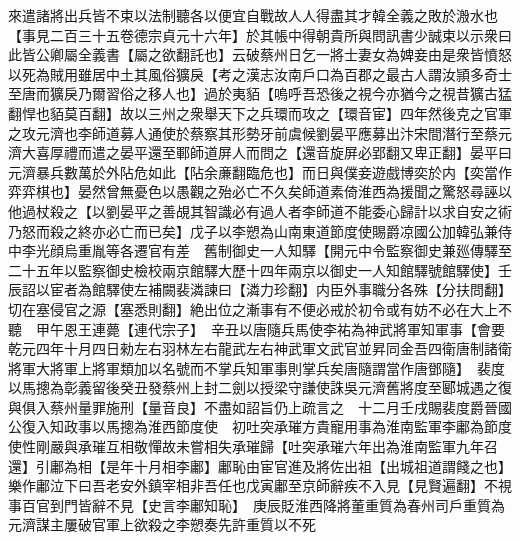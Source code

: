 來遣諸將出兵皆不束以法制聽各以便宜自戰故人人得盡其才韓全義之敗於溵水也【事見二百三十五卷德宗貞元十六年】於其帳中得朝貴所與問訊書少誠束以示衆曰此皆公卿屬全義書【屬之欲翻託也】云破蔡州日乞一將士妻女為婢妾由是衆皆憤怒以死為賊用雖居中土其風俗獷戾【考之漢志汝南戶口為百郡之最古人謂汝頴多奇士至唐而獷戾乃爾習俗之移人也】過於夷貊【嗚呼吾恐後之視今亦猶今之視昔獷古猛翻悍也貊莫百翻】故以三州之衆舉天下之兵環而攻之【環音宦】四年然後克之官軍之攻元濟也李師道募人通使於蔡察其形勢牙前虞候劉晏平應募出汴宋間潛行至蔡元濟大喜厚禮而遣之晏平還至鄆師道屏人而問之【還音旋屏必郢翻又卑正翻】晏平曰元濟暴兵數萬於外阽危如此【阽余亷翻臨危也】而日與僕妾遊戲博奕於内【奕當作弈弈棋也】晏然曾無憂色以愚觀之殆必亡不久矣師道素倚淮西為援聞之驚怒尋誣以他過杖殺之【以劉晏平之善覘其智識必有過人者李師道不能委心歸計以求自安之術乃怒而殺之終亦必亡而已矣】戊子以李愬為山南東道節度使賜爵凉國公加韓弘兼侍中李光顔烏重胤等各遷官有差　舊制御史一人知驛【開元中令監察御史兼廵傳驛至二十五年以監察御史檢校兩京館驛大歷十四年兩京以御史一人知館驛號館驛使】壬辰詔以宦者為館驛使左補闕裴潾諫曰【潾力珍翻】内臣外事職分各殊【分扶問翻】切在塞侵官之源【塞悉則翻】絶出位之漸事有不便必戒於初令或有妨不必在大上不聽　甲午恩王連薨【連代宗子】　辛丑以唐隨兵馬使李祐為神武將軍知軍事【會要乾元四年十月四日勑左右羽林左右龍武左右神武軍文武官並昇同金吾四衛唐制諸衛將軍大將軍上將軍類加以名號而不掌兵知軍事則掌兵矣唐隨謂當作唐鄧隨】　裴度以馬摠為彰義留後癸丑發蔡州上封二劍以授梁守謙使誅吳元濟舊將度至郾城遇之復與俱入蔡州量罪施刑【量音良】不盡如詔旨仍上疏言之　十二月壬戌賜裴度爵晉國公復入知政事以馬摠為淮西節度使　初吐突承璀方貴寵用事為淮南監軍李鄘為節度使性剛嚴與承璀互相敬憚故未嘗相失承璀歸【吐突承璀六年出為淮南監軍九年召還】引鄘為相【是年十月相李鄘】鄘恥由宦官進及將佐出祖【出城祖道謂餞之也】樂作鄘泣下曰吾老安外鎮宰相非吾任也戊寅鄘至京師辭疾不入見【見賢遍翻】不視事百官到門皆辭不見【史言李鄘知恥】　庚辰貶淮西降將董重質為春州司戶重質為元濟謀主屢破官軍上欲殺之李愬奏先許重質以不死

